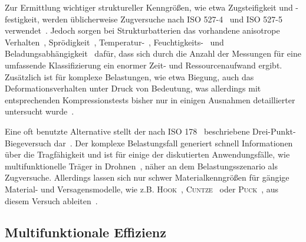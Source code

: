Zur Ermittlung wichtiger struktureller Kenngrößen, wie etwa Zugsteifigkeit und -festigkeit, werden üblicherweise Zugversuche nach ISO 527-4~\cite{ISO527-4-2023} und ISO 527-5~\cite{ISO527-5-2021} verwendet~\cite{Xu2022,Liu2022a}. Jedoch sorgen bei Strukturbatterien das vorhandene anisotrope Verhalten~\cite{Carlstedt2020b}, Sprödigkeit~\cite{Kalnin1982}, Temperatur-~\cite{Carlstedt2019a,Carlstedt2022b}, Feuchtigkeits-~\cite{Kosfeld2023} und Beladungsabhängigkeit~\cite{Qi2010,Duan2021} dafür, dass sich durch die Anzahl der Messungen für eine umfassende Klassifizierung ein enormer Zeit- und Ressourcenaufwand ergibt. Zusätzlich ist für komplexe Belastungen, wie etwa Biegung, auch das Deformationsverhalten unter Druck von Bedeutung, was allerdings mit entsprechenden Kompressionstests bisher nur in einigen Ausnahmen detaillierter untersucht wurde~\cite{Liu2022a,DiMauro2023}.

Eine oft benutzte Alternative stellt der nach ISO 178~\cite{ISO178-2019} beschriebene Drei-Punkt-Biegeversuch dar~\cite{AriefBudiman2022, Keshavarzi2022, Jin2021}. Der komplexe Belastungsfall generiert schnell Informationen über die Tragfähigkeit und ist für einige der diskutierten Anwendungsfälle, wie multifunktionelle Träger in Drohnen~\cite{Hollinger2019}, näher an dem Belastungsszenario als Zugversuche. Allerdings lassen sich nur schwer Materialkenngrößen für gängige Material- und Versagensmodelle, wie z.B. \textsc{Hook}~\cite{Atanackovic2000}, \textsc{Cuntze}~\cite{Cuntze2004} oder \textsc{Puck}~\cite{Puck2004}, aus diesem Versuch ableiten~\cite{Saba2019}.

\subsection{Multifunktionale Effizienz}

